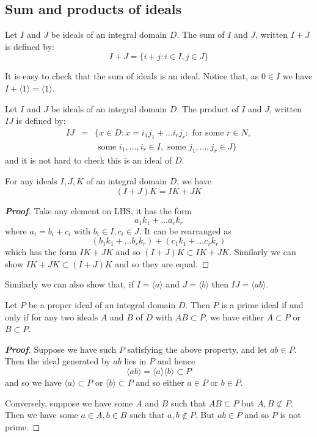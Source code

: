 \subsection{Sum and products of ideals}
\begin{definition} Let $I$ and $J$ be ideals of an integral domain $D$. The sum of $I$ and $J$, written
$I+J$ is defined by:
$$I+J=\{i+j: i \in I, j \in J\}$$
\end{definition}
It is easy to check that the sum of ideals is an ideal. Notice that, as $0 \in I$ we have
$I+ \langle 1 \rangle=\langle 1 \rangle$.
\begin{definition} Let $I$ and $J$ be ideals of an integral domain $D$. The product of $I$ and $J$, written $IJ$ is defined by:
\begin{eqnarray*}
I J&=&\{x \in D: x=i_1j_1+\ldots i_r j_r: \text{ for some } r \in N, \\
&~&\text{ some } i_1,\ldots,i_r \in I, \text{ some }  j_1,\ldots, j_r \in J\}
\end{eqnarray*}
and it is not hard to check this is an ideal of $D$.
\end{definition}
\begin{lemma} For any ideals $I,J,K$ of an integral domain $D$, we have
$$(I+J)K=IK+JK$$
\end{lemma}
\begin{proof}[\bf Proof] Take any element on LHS, it has the form
$$a_1k_1+\ldots a_r k_r$$ where $a_i=b_i+c_i$ with $b_i \in I,c_i \in J$.
It can be rearranged as
$$(b_1k_1+\ldots b_r k_r)+(c_1k_1+\ldots c_r k_r)$$ which has the form $IK+JK$ and so
$(I+J)K \subset IK+JK$.
Similarly we can show $IK+JK \subset (I+J)K$ and so they are equal.
\end{proof}
Similarly we can also show that, if $I= \langle a \rangle$ and $J= \langle b \rangle$ then
$IJ= \langle ab \rangle$.
\begin{theorem} Let $P$ be a proper ideal of an integral domain $D$. Then $P$ is a prime ideal if and only if for any two ideals $A$ and $B$ of $D$ with $AB \subset P$, we have either $A \subset P$ or $B \subset P$.
\end{theorem}
\begin{proof}[\bf Proof] Suppose we have such $P$ satisfying the above property, and let $ab \in P$. Then
the ideal generated by $ab$ lies in $P$ and hence
$$ \langle ab \rangle= \langle a \rangle  \langle b \rangle \subset P$$ and so
we have $ \langle a \rangle \subset P$ or $ \langle b \rangle \subset P$ and so
either $a \in P$ or $b \in P$.

Conversely, suppose we have some $A$ and $B$ such that $AB \subset P$ but $A,B \not \subset P$.
Then we have some $a \in A,b \in B$ such that $a,b \not \in P$. But $ab \in P$ and so $P$ is not prime.
\end{proof}
